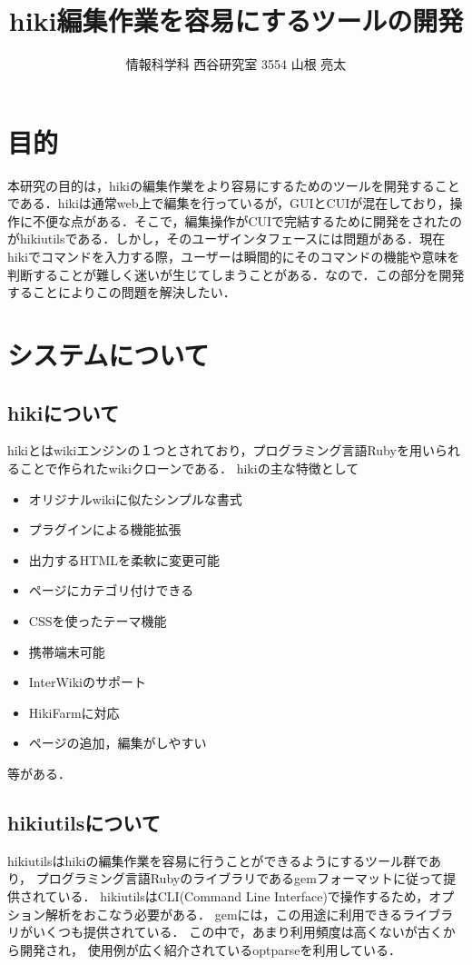 \documentclass[a4j,twocolumn]{jsarticle}
\begin{document}
\title{hiki編集作業を容易にするツールの開発}
\author{情報科学科 西谷研究室 3554 山根 亮太}
\date{}
\maketitle
\section{目的}
本研究の目的は，hikiの編集作業をより容易にするためのツールを開発することである．hikiは通常web上で編集を行っているが，GUIとCUIが混在しており，操作に不便な点がある．そこで，編集操作がCUIで完結するために開発をされたのがhikiutilsである．しかし，そのユーザインタフェースには問題がある．現在hikiでコマンドを入力する際，ユーザーは瞬間的にそのコマンドの機能や意味を判断することが難しく迷いが生じてしまうことがある．なので．この部分を開発することによりこの問題を解決したい．

\section{システムについて}
\subsection{hikiについて}
hikiとはwikiエンジンの１つとされており，プログラミング言語Rubyを用いられることで作られたwikiクローンである．
hikiの主な特徴として
\begin{itemize}
\item オリジナルwikiに似たシンプルな書式
\item プラグインによる機能拡張
\item 出力するHTMLを柔軟に変更可能
\item ページにカテゴリ付けできる
\item CSSを使ったテーマ機能
\item 携帯端末可能
\item InterWikiのサポート
\item HikiFarmに対応
\item ページの追加，編集がしやすい
\end{itemize}
等がある\cite{hiki}．

\subsection{hikiutilsについて}
hikiutilsはhikiの編集作業を容易に行うことができるようにするツール群であり，
プログラミング言語Rubyのライブラリであるgemフォーマットに従って提供されている\cite{gem}．
hikiutilsはCLI(Command Line Interface)で操作するため，オプション解析をおこなう必要がある．
gemには，この用途に利用できるライブラリがいくつも提供されている\cite{opt_ranking}．
この中で，あまり利用頻度は高くないが古くから開発され，
使用例が広く紹介されているoptparseを利用している．
\end{document}
